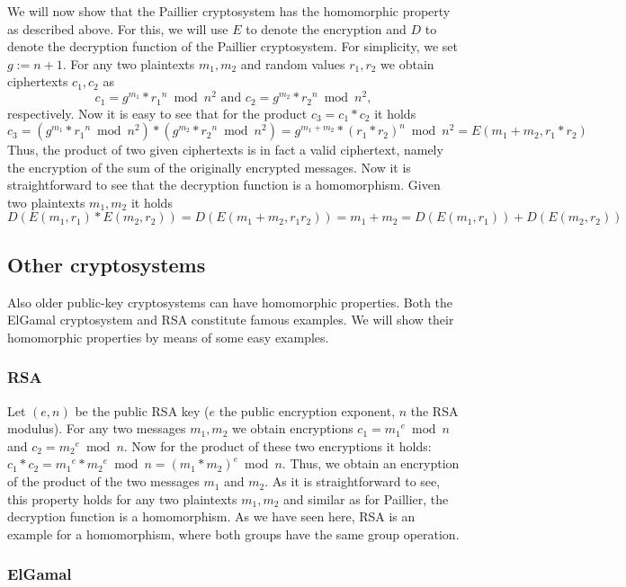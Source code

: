We will now show that the Paillier cryptosystem has the homomorphic property as described above. For this, we will use $E$ to denote the encryption and $D$ to denote the decryption function of the Paillier cryptosystem. For simplicity, we set $g:= n+1$.  For any two plaintexts $m_1,m_2$ and random values $r_1, r_2$ we obtain ciphertexts $c_1, c_2$ as
%
$$c_1 = g^{m_1} *  {r_1}^n \bmod n^2 \mbox{ and } c_2 = g^{m_2} * {r_2}^n \bmod n^2,$$
%
respectively. Now it is easy to see that for the product $c_3 = c_1 * c_2$ it holds
%
$$c_3 = (g^{m_1} * {r_1}^n \bmod n^2) * (g^{m_2} * {r_2}^n \bmod n^2) = g^{m_1+m_2} * (r_1*r_2 )^n \bmod n^2 = E(m_1 + m_2, r_1*r_2)$$
%
Thus, the product of two given ciphertexts is in fact a valid ciphertext, namely the encryption of the sum of the originally encrypted messages. Now it is straightforward to see that the decryption function is a homomorphism. Given two plaintexts $m_1, m_2$ it holds
%
$$D( E(m_1,r_1) * E(m_2,r_2)) = D( E(m_1+m_2, r_1 r_2)) = m_1  + m_2 = D(E(m_1,r_1)) + D(E(m_2,r_2))$$

\subsection{Other cryptosystems}

Also older public-key cryptosystems can have homomorphic properties. Both the ElGamal cryptosystem and RSA constitute famous examples. We will show their homomorphic properties by means of some easy examples.

\subsubsection{RSA}

Let $(e,n)$ be the public RSA key ($e$ the public encryption exponent, $n$ the RSA modulus). For any two messages $m_1, m_2$ we obtain encryptions $c_1 = {m_1}^e \bmod n$ and $c_2 = {m_2}^e \bmod n$. Now for the product of these two encryptions it holds: $c_1*c_2={m_1}^e * {m_2}^e \bmod n=(m_1*m_2)^e \bmod n$. Thus, we obtain an encryption of the product of the two messages $m_1$ and $m_2$. As it is straightforward to see, this property holds for any two plaintexts $m_1, m_2$ and similar as for Paillier, the decryption function is a homomorphism. As we have seen here, RSA is an example for a homomorphism, where both groups have the same group operation.

\subsubsection{ElGamal}

